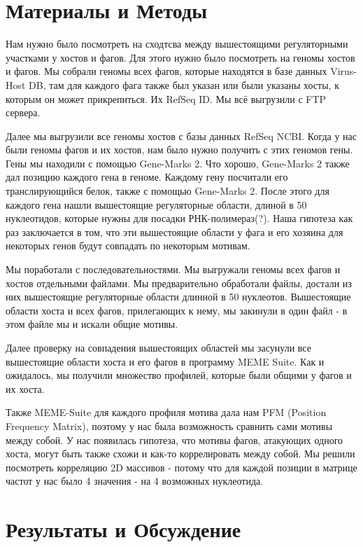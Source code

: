 \documentclass[a4paper,12pt]{article}
\begin{document}
\section{Материалы и Методы} \label{sec:code}
\par{}
Нам нужно было посмотреть на сходтсва между вышестоящими регуляторными участками у хостов и фагов. Для этого нужно было
посмотреть на геномы хостов и фагов. Мы собрали геномы всех фагов, которые находятся в базе данных Virus-Host DB, там для
каждого фага также был указан или были указаны хосты, к которым он может прикрепиться. Их RefSeq ID. Мы всё выгрузили с
FTP сервера.
\par{}
Далее мы выгрузили все геномы хостов с базы данных RefSeq NCBI. Когда у нас были геномы фагов и их хостов, нам было нужно
получить с этих геномов гены. Гены мы находили с помощью Gene-Marks 2. Что хорошо, Gene-Marks 2 также дал позицию каждого
гена в геноме. Каждому гену посчитали его транслирующийся белок, также с помощью Gene-Marks 2. После этого для каждого
гена нашли вышестоящие регуляторные области, длиной в 50 нуклеотидов, которые нужны для посадки РНК-полимераз(?). Наша
гипотеза как раз заключается в том, что эти вышестоящие области у фага и его хозяина для некоторых генов будут совпадать
по некоторым мотивам.
\par{}
Мы поработали с последовательностями. Мы выгружали геномы всех фагов и хостов отдельными файлами. Мы предварительно
обработали файлы, достали из них вышестоящие регуляторные области длинной в 50 нуклеотов. Вышестоящие области хоста и
всех фагов, прилегающих к нему, мы закинули в один файл - в этом файле мы и искали общие мотивы.
\par{}
Далее проверку на совпадения вышестоящих областей мы засунули все вышестоящие области хоста и его фагов в программу MEME
Suite. Как и ожидалось, мы получили множество профилей, которые были общими у фагов и их хоста. 
\par{}
Также MEME-Suite для каждого профиля мотива дала нам PFM (Position Frequency Matrix), поэтому у нас была возможность
сравнить сами мотивы между собой. У нас появилась гипотеза, что мотивы фагов, атакующих одного хоста, могут быть также
схожи и как-то коррелировать между собой. Мы решили посмотреть корреляцию 2D массивов - потому что для каждой позиции в
матрице частот у нас было 4 значения - на 4 возможных нуклеотида.

\newpage
\section{Результаты и Обсуждение}
\end{document}
